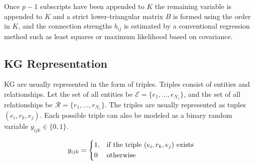 \documentclass{article}
\begin{document}
Once $p-1$ subscripts have been appended to $K$ the remaining variable is appended to $K$ and a strict lower-triangular matrix $B$ is formed using the order in $K$, and the connection strengths $b_{ij}$ is estimated by a conventional regression method such as least squares or maximum likelihood based on covariance.




\subsection{KG Representation}
KG are usually represented in the form of triples. Triples consist of entities and relationships. Let the set of all entities be  $\mathcal{E} = \{e_1,...,e_{N_e}\}$,
and the set of all relationships be $\mathcal{R} = \{r_1,...,r_{N_r}\}$. The triples are usually represented as tuples $(e_i,r_k,e_j)$. Each possible triple can also be modeled as a binary random variable $y_{ijk} \in \{0,1\}$.

\[
y_{ijk} = 
    \begin{dcases}
        1, & \text{if the triple $(e_i,r_k,e_j)$ exists}\\
        0 & \text{otherwise} \\
    \end{dcases}
\]

\end{document}
